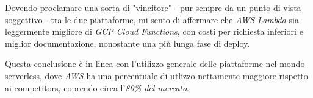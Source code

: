 Dovendo proclamare una sorta di "vincitore" - pur sempre da un punto di vista soggettivo - tra le due piattaforme, mi sento di affermare che \textit{AWS Lambda} sia leggermente migliore di \textit{GCP Cloud Functions}, con costi per richiesta inferiori e miglior documentazione, nonostante una più lunga fase di deploy.

Questa conclusione è in linea con l'utilizzo generale delle piattaforme nel mondo serverless, dove \textit{AWS} ha una percentuale di utlizzo nettamente maggiore rispetto ai competitors, coprendo circa l'\textit{80\% del mercato}\cite{eismann2021state}.